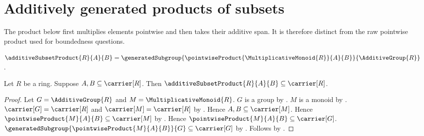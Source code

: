 









\section{Additively generated products of subsets}

The product below first multiplies elements pointwise and then takes their
additive span.  It is therefore distinct from the raw pointwise product used
for boundedness questions.

\begin{definition}\label{additive_subset_product}
    $\additiveSubsetProduct{R}{A}{B}=
        \generatedSubgroup{
            \pointwiseProduct{\MultiplicativeMonoid{R}}{A}{B}}
            {\AdditiveGroup{R}}$.
\end{definition}

\begin{proposition}\label{additive_subset_product_type}
    Let $R$ be a ring.
    Suppose $A,B\subseteq\carrier[R]$.
    Then $\additiveSubsetProduct{R}{A}{B}\subseteq\carrier[R]$.
\end{proposition}
\begin{proof}
    Let $G=\AdditiveGroup{R}$ and $M=\MultiplicativeMonoid{R}$.
    $G$ is a group by .
    $M$ is a monoid by .
    $\carrier[G]=\carrier[R]$ and $\carrier[M]=\carrier[R]$ by
        .
    Hence $A,B\subseteq\carrier[M]$.
    Hence $\pointwiseProduct{M}{A}{B}\subseteq\carrier[M]$ by
        .
    Hence $\pointwiseProduct{M}{A}{B}\subseteq\carrier[G]$.
    $\generatedSubgroup{\pointwiseProduct{M}{A}{B}}{G}
        \subseteq\carrier[G]$ by
        .
    Follows by .
\end{proof}

